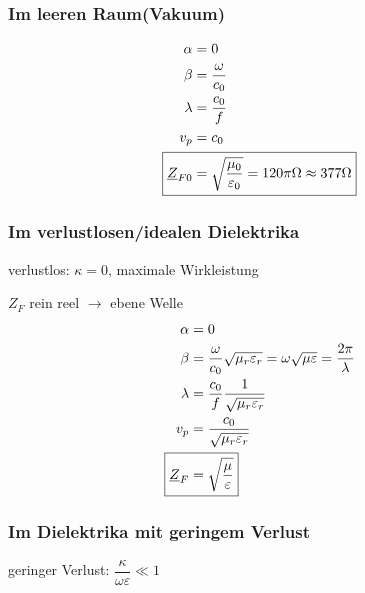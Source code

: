 \subsubsection{Im leeren Raum(Vakuum)}
\begin{align*}
    \alpha                     & = 0                                                                    \\
    \beta                          & = \dfrac{\omega}{c_0}                                                  \\
    \lambda                    & = \dfrac{c_0}{f}                                                       \\
    v_p                        & = c_0                                                                  \\
    \Aboxed{\underline{Z}_{F0} & = \sqrt{\dfrac{\mu_0}{\varepsilon_0}} = 120 \pi\Omega\approx377\Omega}
\end{align*}

\subsubsection{Im verlustlosen/idealen Dielektrika}
verlustlos: $\kappa =0$, maximale Wirkleistung

$Z_F$ rein reel $\rightarrow$ ebene Welle
\begin{align*}
    \alpha                  & = 0                                                                                              \\
    \beta                       & = \dfrac{\omega}{c_0}\sqrt{\mu_r\varepsilon_r}=\omega\sqrt{\mu\varepsilon}=\dfrac{2\pi}{\lambda} \\
    \lambda                 & = \dfrac{c_0}{f}\dfrac{1}{\sqrt{\mu_r\varepsilon_r}}                                             \\
    v_p                     & = \dfrac{c_0}{\sqrt{\mu_r\varepsilon_r}}                                                         \\
    \Aboxed{\underline{Z}_F & = \sqrt{\dfrac{\mu}{\varepsilon}}}
\end{align*}

\subsubsection{Im Dielektrika mit geringem Verlust}
geringer Verlust: $\dfrac{\kappa}{\omega\varepsilon} \ll 1$

